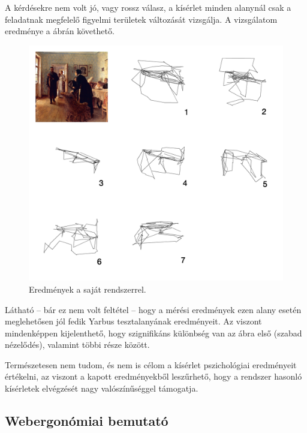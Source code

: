 A kérdésekre nem volt jó, vagy rossz válasz, a kísérlet minden alanynál csak a feladatnak megfelelő figyelmi területek változását vizsgálja. A vizsgálatom eredménye a  ábrán követhető.

\begin{figure}[!ht]
\centering
\includegraphics[width=140mm, keepaspectratio]{figures/yarbus_eredmeny.png}
\caption{Eredmények a saját rendszerrel.}
\label{fig:eredmeny}
\end{figure}

Látható -- bár ez nem volt feltétel -- hogy a mérési eredmények ezen alany esetén meglehetősen jól fedik Yarbus tesztalanyának eredményeit. Az viszont mindenképpen kijelenthető, hogy szignifikáns különbség van az ábra első (szabad nézelődés), valamint többi része között.

Természetesen nem tudom, és nem is célom a kísérlet pszichológiai eredményeit értékelni, az viszont a kapott eredményekből leszűrhető, hogy a rendszer hasonló kísérletek elvégzését nagy valószínűséggel támogatja.

\subsection{Webergonómiai bemutató}\label{sect:web}

